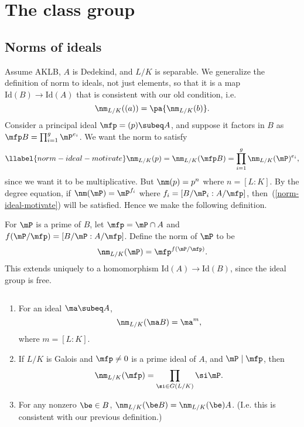 \chapter{The class group}
\section{Norms of ideals}
Assume AKLB, $A$ is Dedekind, and $L/K$ is separable. 
We generalize the definition of norm to ideals, not just elements, so that it is a map $\text{Id}(B)\to \text{Id}(A)$ that is consistent with our old condition, i.e.
\[
\nm_{L/K}((a))=\pa{\nm_{L/K}(b)}.
\]
Consider a principal ideal $\mfp=(p)\subeq A$, and suppose it factors in $B$ as $\mfp B=\prod_{i=1}^g \mP^{e_i}$. We want the norm to satisfy
\begin{equation}\llabel{norm-ideal-motivate}
\nm_{L/K}(p)=\nm_{L/K}(\mfp B)=\prod_{i=1}^g \nm_{L/K}(\mP)^{e_i},
\end{equation}
since we want it to be multiplicative. But $\nm(p)=p^n$ where $n=[L:K]$. By the degree equation, if $\nm(\mP)=\mP^{f_i}$ where $f_i=[B/\mP_i:A/\mfp]$, then~(\ref{norm-ideal-motivate}) will be satisfied. Hence we make the following definition.
\begin{df}
For $\mP$ is a prime of $B$, let $\mfp=\mP\cap A$ and $f(\mP/\mfp)=[B/\mP:A/\mfp]$. Define the norm of $\mP$ to be
\[
\nm_{L/K}(\mP)=\mfp^{f(\mP/\mfp)}.
\]
This extends uniquely to a homomorphism $\text{Id}(A)\to \text{Id}(B)$, since the ideal group is free.
\end{df}
\begin{pr}$\,$
\begin{enumerate}
\item
For an ideal $\ma\subeq A$, 
\[
\nm_{L/K}(\ma B)=\ma^m,
\]
where $m=[L:K]$.
\item
If $L/K$ is Galois and $\mfp\ne 0$ is a prime ideal of $A$, and $\mP\mid \mfp$, then %
\[
\nm_{L/K}(\mfp)
=\prod_{\si\in G(L/K)}\si \mP.
\]
\item For any nonzero $\be\in B$, $\nm_{L/K}(\be B)=\nm_{L/K}(\be)A$. (I.e. this is consistent with our previous definition.)
\end{enumerate}
\end{pr}
